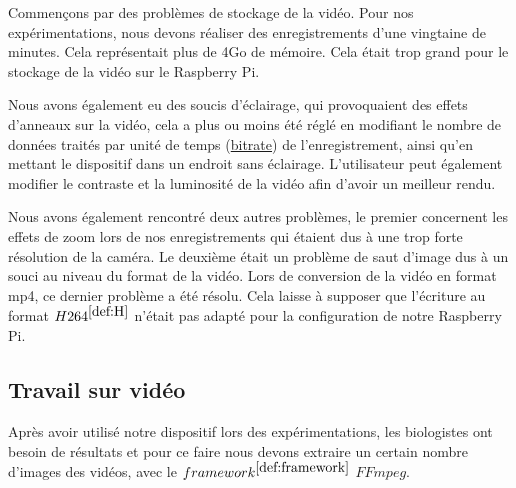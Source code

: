         \vspace{0.2cm}

        Commençons par des problèmes de stockage de la vidéo. Pour nos expérimentations, nous devons réaliser des enregistrements d'une vingtaine de minutes.
        Cela représentait plus de 4Go de mémoire.
        Cela était trop grand pour le stockage de la vidéo sur le Raspberry Pi.

        \vspace{0.2cm}

        Nous avons également eu des soucis d'éclairage, qui provoquaient des effets d'anneaux sur la vidéo, cela a plus ou moins été réglé en modifiant le nombre de données traités par unité de temps (\underline{bitrate}) de l'enregistrement, ainsi qu'en mettant le dispositif dans un endroit sans éclairage.
        L'utilisateur peut également modifier le contraste et la luminosité de la vidéo afin d'avoir un meilleur rendu.

        \vspace{0.2cm}


        Nous avons également rencontré deux autres problèmes, le premier concernent les effets de zoom lors de nos enregistrements qui étaient dus à une trop forte résolution de la caméra. Le deuxième était un problème de saut d'image dus à un souci au niveau du format de la vidéo.
        Lors de conversion de la vidéo en format mp4, ce dernier problème a été résolu.
        Cela laisse à supposer que l'écriture au format \underline{$H264^{\ref{def:H}}$} n'était pas adapté pour la configuration de notre Raspberry Pi.

        \subsection{Travail sur vidéo}
        Après avoir utilisé notre dispositif lors des expérimentations, les biologistes ont besoin de résultats et pour ce faire nous devons extraire un certain nombre d'images des vidéos, avec le  \underline{$framework^{\ref{def:framework}}$} \textbf{$FFmpeg$}.

